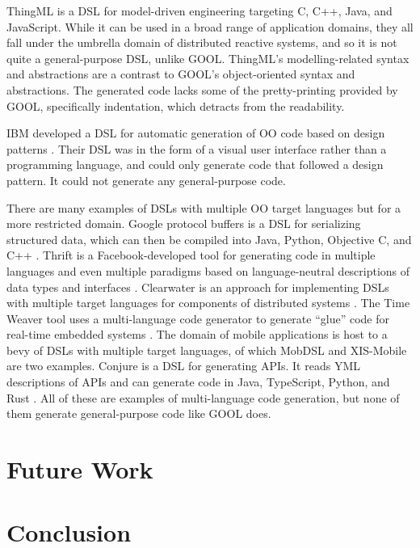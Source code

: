 \documentclass[sigplan,review,anonymous]{acmart}
\begin{document}
ThingML \cite{harrand2016thingml} is a DSL for model-driven engineering 
targeting C, C++, Java, and 
JavaScript. While it can be used in a broad range of application domains, they 
all fall under the umbrella domain of distributed reactive systems, and so it 
is not quite a general-purpose DSL, unlike GOOL. ThingML's modelling-related 
syntax and abstractions are a contrast to GOOL's object-oriented syntax and 
abstractions. The generated code lacks some of the pretty-printing provided by 
GOOL, specifically indentation, which detracts from the readability.

IBM developed a DSL for automatic generation of OO code based on design 
patterns \cite{budinsky1996automatic}. Their DSL was in the form of a visual 
user interface rather than a programming language, and could only generate code 
that followed a design pattern. It could not generate any general-purpose code.

There are many examples of DSLs with multiple OO target languages but for a 
more restricted domain. Google protocol buffers is a DSL for serializing 
structured data, which can then be compiled into Java, Python, Objective C, and 
C++ \cite{Protobuf}. Thrift is a Facebook-developed tool for generating code in 
multiple languages and even multiple paradigms based on language-neutral 
descriptions of data types and interfaces \cite{slee2007thrift}. Clearwater is 
an approach for implementing DSLs with multiple target languages for components 
of distributed systems \cite{swint2005clearwater}. The Time Weaver tool uses a 
multi-language code generator to generate ``glue'' code for real-time embedded 
systems \cite{de2004glue}. The domain of mobile 
applications is host to a bevy of DSLs with multiple target languages, of which 
MobDSL \cite{kramer2010mobdsl} and XIS-Mobile \cite{ribeiro2014xis} are two 
examples. Conjure is a DSL for generating APIs. It reads YML descriptions of 
APIs and can generate code in Java, TypeScript, Python, and Rust 
\cite{Conjure}. All of these are examples of multi-language code generation, 
but none of them generate general-purpose code like GOOL does.

\section{Future Work} \label{future}
\section{Conclusion} \label{conclusions}
\end{document}
